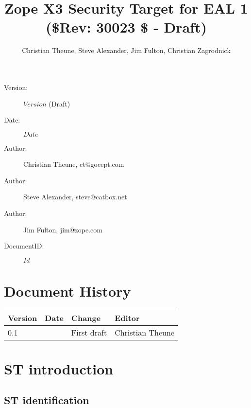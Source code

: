 \documentclass[10pt,a4paper,english]{scrbook}
\title{Zope X3 Security Target for EAL 1 ({\$}Rev: 30023 {\$} - Draft)}
\author{Christian Theune, Steve Alexander, Jim Fulton, Christian Zagrodnick}
\date{}
\begin{document}
\maketitle


\begin{description}
    \item[Version:] $Version$ (Draft)
    \item[Date:] $Date$ 
    \item[Author:] Christian Theune, ct@gocept.com
    \item[Author:] Steve Alexander, steve@catbox.net
    \item[Author:] Jim Fulton, jim@zope.com
    \item[DocumentID:] $Id$
\end{description}

\newpage

\tableofcontents



\hypertarget{document-history}{}
\chapter{Document History}

\begin{longtable}{|l|l|l|l|}
\hline
\textbf{
Version
} & \textbf{
Date
} & \textbf{
Change
} & \textbf{
Editor
} \\
\hline
\endhead

0.1
 &  & 
First draft
 & 
Christian Theune
 \\
\hline
\end{longtable}



\hypertarget{st-introduction}{}
\chapter{ST introduction}



\hypertarget{st-identification}{}
\section{ST identification}
\end{document}
